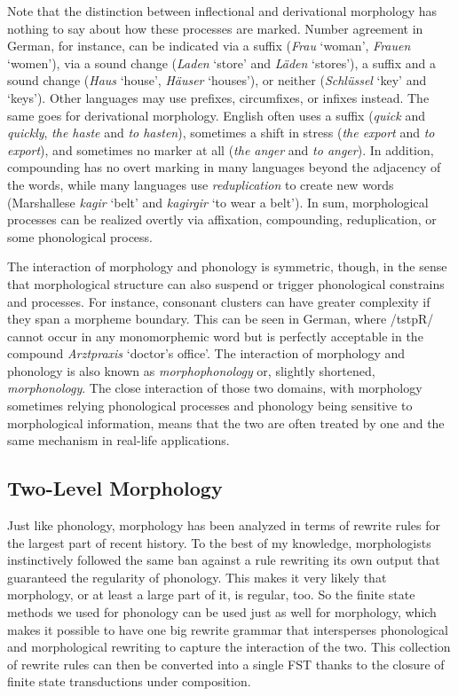Note that the distinction between inflectional and derivational morphology has nothing to say about how these processes are marked.
Number agreement in German, for instance, can be indicated via a suffix (\emph{Frau} `woman', \emph{Frauen} `women'), via a sound change (\emph{Laden} `store' and \emph{Läden} `stores'), a suffix and a sound change (\emph{Haus} `house', \emph{Häuser} `houses'), or neither (\emph{Schlüssel} `key' and `keys').
Other languages may use prefixes, circumfixes, or infixes instead.
The same goes for derivational morphology.
English often uses a suffix (\emph{quick} and \emph{quickly}, \emph{the haste} and \emph{to hasten}), sometimes a shift in stress (\emph{the export} and \emph{to export}), and sometimes no marker at all (\emph{the anger} and \emph{to anger}).
In addition, compounding has no overt marking in many languages beyond the adjacency of the words, while many languages use \emph{reduplication} to create new words (Marshallese \emph{kagir} `belt' and \emph{kagirgir} `to wear a belt').
In sum, morphological processes can be realized overtly via affixation, compounding, reduplication, or some phonological process.

The interaction of morphology and phonology is symmetric, though, in the sense that morphological structure can also suspend or trigger phonological constrains and processes.
For instance, consonant clusters can have greater complexity if they span a morpheme boundary.
This can be seen in German, where /tstpR/ cannot occur in any monomorphemic word but is perfectly acceptable in the compound \emph{Arztpraxis} `doctor's office'.
The interaction of morphology and phonology is also known as \emph{morphophonology} or, slightly shortened, \emph{morphonology}.
The close interaction of those two domains, with morphology sometimes relying phonological processes and phonology being sensitive to morphological information, means that the two are often treated by one and the same mechanism in real-life applications.

\subsection{Two-Level Morphology}

Just like phonology, morphology has been analyzed in terms of rewrite rules for the largest part of recent history.
To the best of my knowledge, morphologists instinctively followed the same ban against a rule rewriting its own output that guaranteed the regularity of phonology.
This makes it very likely that morphology, or at least a large part of it, is regular, too.
So the finite state methods we used for phonology can be used just as well for morphology, which makes it possible to have one big rewrite grammar that intersperses phonological and morphological rewriting to capture the interaction of the two.
This collection of rewrite rules can then be converted into a single FST thanks to the closure of finite state transductions under composition.

